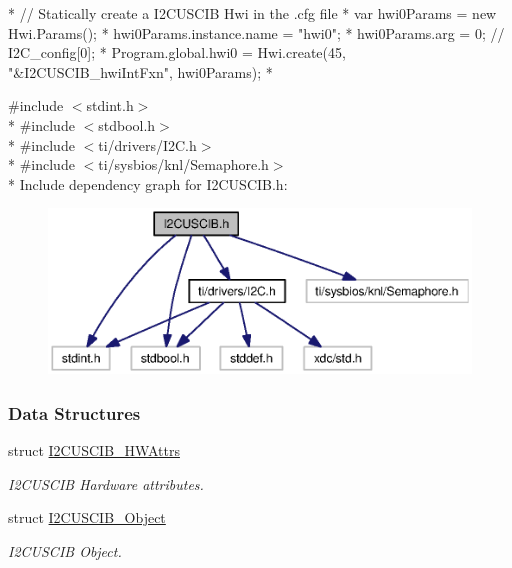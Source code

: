 \begin{DoxyCode}
*  \textcolor{comment}{// Statically create a I2CUSCIB Hwi in the .cfg file}
*  var hwi0Params = \textcolor{keyword}{new} Hwi.Params();
*  hwi0Params.instance.name = \textcolor{stringliteral}{"hwi0"};
*  hwi0Params.arg = 0;  \textcolor{comment}{// I2C\_config[0];}
*  Program.global.hwi0 = Hwi.create(45, \textcolor{stringliteral}{"&I2CUSCIB\_hwiIntFxn"}, hwi0Params);
*  
\end{DoxyCode}
 

{\ttfamily \#include $<$stdint.\-h$>$}\\*
{\ttfamily \#include $<$stdbool.\-h$>$}\\*
{\ttfamily \#include $<$ti/drivers/\-I2\-C.\-h$>$}\\*
{\ttfamily \#include $<$ti/sysbios/knl/\-Semaphore.\-h$>$}\\*
Include dependency graph for I2\-C\-U\-S\-C\-I\-B.\-h\-:
\nopagebreak
\begin{figure}[H]
\begin{center}
\leavevmode
\includegraphics[width=350pt]{_i2_c_u_s_c_i_b_8h__incl}
\end{center}
\end{figure}
\subsubsection*{Data Structures}
\begin{DoxyCompactItemize}
\item 
struct \hyperlink{struct_i2_c_u_s_c_i_b___h_w_attrs}{I2\-C\-U\-S\-C\-I\-B\-\_\-\-H\-W\-Attrs}
\begin{DoxyCompactList}\small\item\em I2\-C\-U\-S\-C\-I\-B Hardware attributes. \end{DoxyCompactList}\item 
struct \hyperlink{struct_i2_c_u_s_c_i_b___object}{I2\-C\-U\-S\-C\-I\-B\-\_\-\-Object}
\begin{DoxyCompactList}\small\item\em I2\-C\-U\-S\-C\-I\-B Object. \end{DoxyCompactList}\end{DoxyCompactItemize}
